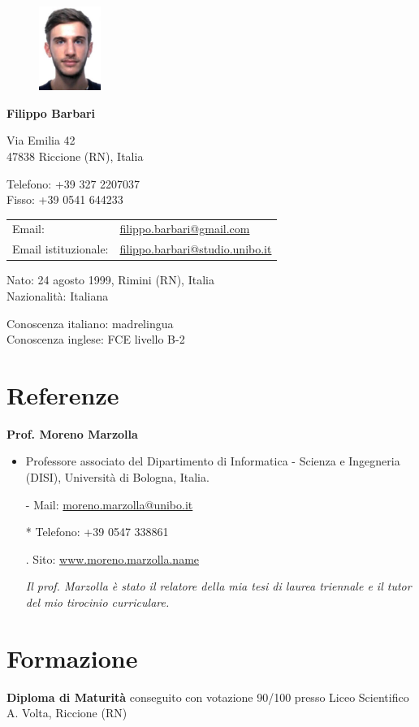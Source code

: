 \documentclass{article}
\newcommand{\years}[1]{\marginnote{\small #1}} %
\newcommand{\referenza}[6]{
	\textbf{#1}
	\begin{itemize}
		\setlength\itemsep{0em}
		\item #2
		\item[-] Mail: #3
		\item[*] Telefono: #4
		\item[.] Sito: #5
		\item[] \textit{#6}
	\end{itemize}
}
\newcommand{\https}[1]{\href{https://#1}{#1}}
\begin{document}
	
	\begin{figure}
		\includegraphics[width=0.18\textwidth]{fototessera}
	\end{figure}
		
	{\LARGE\bfseries Filippo Barbari} %
	\bigskip
	
	Via Emilia 42\\ %
	47838 Riccione (RN), Italia
	\medskip %
	
	Telefono: +39 327 2207037\\
	Fisso: +39 0541 644233
	\medskip
	
	\noindent
	\begin{tabular}{ll}
		Email: & \href{mailto:filippo.barbari@gmail.com}{filippo.barbari@gmail.com}\\
		Email istituzionale: & \href{mailto:filippo.barbari@studio.unibo.it}{filippo.barbari@studio.unibo.it}
	\end{tabular}
	\medskip
	
	Nato: 24 agosto 1999, Rimini (RN), Italia\\ %
	Nazionalità: Italiana %
	\medskip
	
	Conoscenza italiano: madrelingua\\
	Conoscenza inglese: FCE livello B-2
	
	\section*{Referenze}
	
	\referenza{Prof. Moreno Marzolla}
	{Professore associato del Dipartimento di Informatica - Scienza e Ingegneria (DISI), Università di Bologna, Italia.}
	{\href{mailto:moreno.marzolla@unibo.it}{moreno.marzolla@unibo.it}}
	{+39 0547 338861}
	{\https{www.moreno.marzolla.name}}
	{\textit{Il prof. Marzolla è stato il relatore della mia tesi di laurea triennale e il tutor del mio tirocinio curriculare.}}
	
	\section*{Formazione}
	\years{2013 - 2018} \textbf{Diploma di Maturità} conseguito con votazione 90/100 presso Liceo Scientifico A. Volta, Riccione (RN)\\
	
\end{document}
